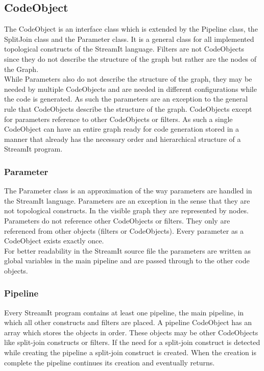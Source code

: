 \documentclass[journal]{IEEEtran}
\begin{document}
\subsection{CodeObject}
\noindent The CodeObject is an interface class which is extended by the Pipeline
class, the SplitJoin class and the Parameter class. It is a general class for
all implemented topological constructs of the StreamIt language. Filters are not
CodeObjects since they do not describe the structure of the graph but rather are
the nodes of the Graph.\\
While Parameters also do not describe the structure of the graph, they may be
needed by multiple CodeObjects and are needed in different configurations while
the code is generated. As such the parameters are an exception to the general
rule that CodeObjects describe the structure of the graph. CodeObjects except
for parameters reference to other CodeObjects or filters. As such a single
CodeObject can have an entire graph ready for code generation stored in a manner
that already has the necessary order and hierarchical structure of a StreamIt
program.


\subsubsection{Parameter}
\noindent The Parameter class is an approximation of the way parameters are
handled in the StreamIt language. Parameters are an exception in the sense that
they are not topological constructs. In the visible graph they are represented
by nodes. Parameters do not reference other CodeObjects or filters. They only
are referenced from other objects (filters or CodeObjects). Every parameter as a
CodeObject exists exactly once.\\
For better readability in the StreamIt source file the parameters are written as
global variables in the main pipeline and are passed through to the other code
objects.\\


\subsubsection{Pipeline}
\noindent Every StreamIt program contains at least one pipeline, the main
pipeline, in which all other constructs and filters are
placed. A pipeline CodeObject has an array which stores the objects in order.
These objects may be other CodeObjects like split-join constructs or filters. If
the need for a split-join construct is detected while creating the pipeline a
split-join construct is created. When the creation is complete the pipeline continues its
creation and eventually returns.\\
\end{document}
